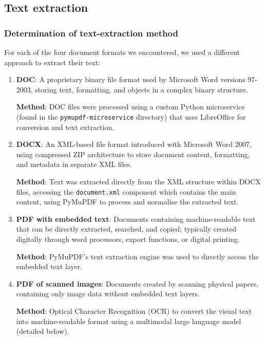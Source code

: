 \documentclass[12pt]{article}
\begin{document}
\subsection{Text extraction}

\subsubsection{Determination of text-extraction method}

For each of the four document formats we encountered,
we used a different approach to extract their text:
\begin{enumerate}
    \item {\bf DOC}: A proprietary binary file format used by Microsoft Word versions 97-2003, storing text, formatting, and objects in a complex binary structure.

    {\bf Method}: DOC files were processed using a custom Python microservice (found in the {\tt pymupdf-microservice} directory) 
    that uses LibreOffice for conversion and text extraction.
    \item {\bf DOCX}: An XML-based file format introduced with Microsoft Word 2007, using compressed ZIP architecture to store document content, formatting, and metadata in separate XML files.

    {\bf Method}: Text was extracted directly from the XML structure within DOCX files, accessing the {\tt document.xml} component which contains the main content, 
    using PyMuPDF to process and normalise the extracted text.
    \item {\bf PDF with embedded text}: Documents containing machine-readable text that can be directly extracted, searched, and copied; typically created digitally through word processors, export functions, or digital printing.

    {\bf Method}: PyMuPDF's text extraction engine was used to directly access the embedded text layer. 
    \item {\bf PDF of scanned images}: Documents created by scanning physical papers, containing only image data without embedded text layers. 
    
    {\bf Method}: Optical Character Recognition (OCR) to convert the visual text into machine-readable format
    using a multimodal large language model (detailed below).
\end{enumerate}
\end{document}
